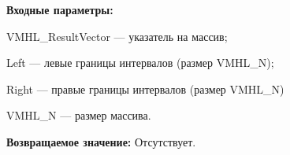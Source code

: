 \textbf{Входные параметры:}

 VMHL\_ResultVector --- указатель на массив;
 
 Left --- левые границы интервалов (размер VMHL\_N);
 
 Right --- правые границы интервалов (размер VMHL\_N)
 
 VMHL\_N --- размер массива.

\textbf{Возвращаемое значение:}
Отсутствует.